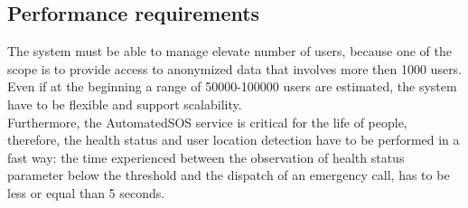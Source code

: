 \subsection{Performance requirements}
The system must be able to manage elevate number of users, because one of the scope is to provide access to anonymized data that involves more then 1000 users. Even if at the beginning a range of 50000-100000 users are estimated, the system have to be flexible and support scalability. \\
Furthermore, the AutomatedSOS service is critical for the life of people, therefore, the health status and user location detection have to be performed in a fast way: the time experienced between the observation of health status parameter below the threshold and the dispatch of an emergency call, has to be less or equal than 5 seconds.  